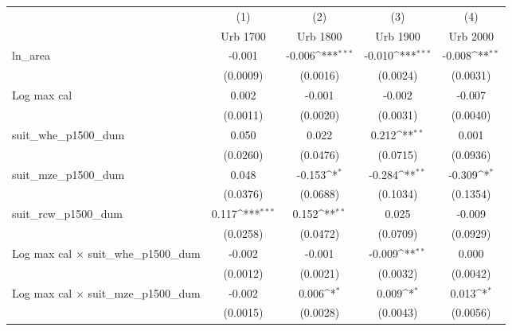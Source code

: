 {
\def\sym#1{\ifmmode^{#1}\else\(^{#1}\)\fi}
\begin{tabular}{l*{4}{c}}
\toprule
                    &\multicolumn{1}{c}{(1)}&\multicolumn{1}{c}{(2)}&\multicolumn{1}{c}{(3)}&\multicolumn{1}{c}{(4)}\\
                    &\multicolumn{1}{c}{Urb 1700}&\multicolumn{1}{c}{Urb 1800}&\multicolumn{1}{c}{Urb 1900}&\multicolumn{1}{c}{Urb 2000}\\
\midrule
ln\_area             &      -0.001         &      -0.006\sym{***}&      -0.010\sym{***}&      -0.008\sym{**} \\
                    &    (0.0009)         &    (0.0016)         &    (0.0024)         &    (0.0031)         \\
\addlinespace
Log max cal         &       0.002         &      -0.001         &      -0.002         &      -0.007         \\
                    &    (0.0011)         &    (0.0020)         &    (0.0031)         &    (0.0040)         \\
\addlinespace
suit\_whe\_p1500\_dum  &       0.050         &       0.022         &       0.212\sym{**} &       0.001         \\
                    &    (0.0260)         &    (0.0476)         &    (0.0715)         &    (0.0936)         \\
\addlinespace
suit\_mze\_p1500\_dum  &       0.048         &      -0.153\sym{*}  &      -0.284\sym{**} &      -0.309\sym{*}  \\
                    &    (0.0376)         &    (0.0688)         &    (0.1034)         &    (0.1354)         \\
\addlinespace
suit\_rcw\_p1500\_dum  &       0.117\sym{***}&       0.152\sym{**} &       0.025         &      -0.009         \\
                    &    (0.0258)         &    (0.0472)         &    (0.0709)         &    (0.0929)         \\
\addlinespace
Log max cal $\times$ suit\_whe\_p1500\_dum&      -0.002         &      -0.001         &      -0.009\sym{**} &       0.000         \\
                    &    (0.0012)         &    (0.0021)         &    (0.0032)         &    (0.0042)         \\
\addlinespace
Log max cal $\times$ suit\_mze\_p1500\_dum&      -0.002         &       0.006\sym{*}  &       0.009\sym{*}  &       0.013\sym{*}  \\
                    &    (0.0015)         &    (0.0028)         &    (0.0043)         &    (0.0056)         \\

\end{tabular}}
